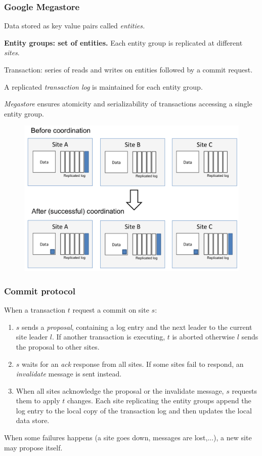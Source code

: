 \documentclass{beamer}
\begin{document}
\begin{frame}
    \frametitle{Google Megastore}
    \scriptsize
    Data stored as key value pairs called \emph{entities.}
    
    \medskip
    \textbf{Entity groups: set of entities.} Each entity group is replicated at different \emph{sites}.
        
    \medskip
    Transaction: series of reads and writes on entities followed by a commit request.
    
    \bigskip
    A replicated \emph{transaction log} is maintained for each entity group.

    \bigskip
    \emph{Megastore} ensures atomicity and serializability of transactions accessing a single entity group.

    \begin{figure}
        \includegraphics[width=\textwidth, height=.5\textheight, keepaspectratio]{img/paxos.png}
    \end{figure}

\end{frame}
\begin{frame}
   \frametitle{Commit protocol}
   When a transaction $t$ request a commit on site $s$:
   \begin{enumerate}
       \item  $s$ sends a \emph{proposal}, containing a log entry and the next leader to the current site leader $l$. 
       If another transaction is executing, $t$ is aborted otherwise $l$ sends the proposal to other sites.
       \item $s$ waits for an \emph{ack} response from all sites. If some sites fail to respond, an \emph{invalidate} message is sent instead.
       \item When all sites acknowledge the proposal or the invalidate message, $s$ requests them to apply $t$ changes. 
        Each site replicating the entity groups append the log entry to the local copy of the transaction log and then updates the local data store.
   \end{enumerate}

   When  some failures happens (a site goes down, messages are lost,...), a new site may propose itself.
\end{frame}
\end{document}
